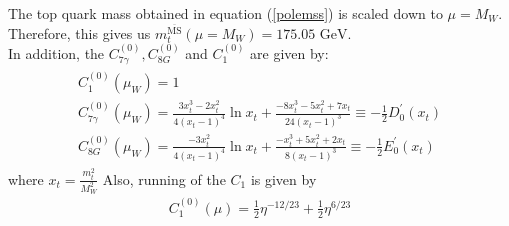 The top quark mass obtained in equation (\ref{polemss}) is scaled down to $\mu=M_W$. Therefore, this gives us $m_t^{\overline{\text{MS}}}(\mu=M_W)=175.05\text{ GeV}$.\\
In addition, the $C_{7 \gamma}^{(0)}, C_{8 G}^{(0)}$ and $C_{1}^{(0)}$ are given by:
\begin{eqnarray}
\begin{array}{c}{C_{1}^{(0)}\left(\mu_{W}\right)=1} \\ {C_{7 \gamma}^{(0)}\left(\mu_{W}\right)=\frac{3 x_{t}^{3}-2 x_{t}^{2}}{4\left(x_{t}-1\right)^{4}} \ln x_{t}+\frac{-8 x_{t}^{3}-5 x_{t}^{2}+7 x_{t}}{24\left(x_{t}-1\right)^{3}} \equiv-\frac{1}{2} D_{0}^{\prime}\left(x_{t}\right)} \\ {C_{8 G}^{(0)}\left(\mu_{W}\right)=\frac{-3 x_{t}^{2}}{4\left(x_{t}-1\right)^{4}} \ln x_{t}+\frac{-x_{t}^{3}+5 x_{t}^{2}+2 x_{t}}{8\left(x_{t}-1\right)^{3}} \equiv-\frac{1}{2} E_{0}^{\prime}\left(x_{t}\right)}\end{array}
\end{eqnarray}
where $x_t=\frac{m_t^2}{M_W^2}$
Also, running of the $C_1$ is given by 
\begin{eqnarray}\label{c1new}
C_{1}^{(0)}(\mu)=\frac{1}{2} \eta^{-12 / 23}+\frac{1}{2} \eta^{6 / 23}
\end{eqnarray} 
